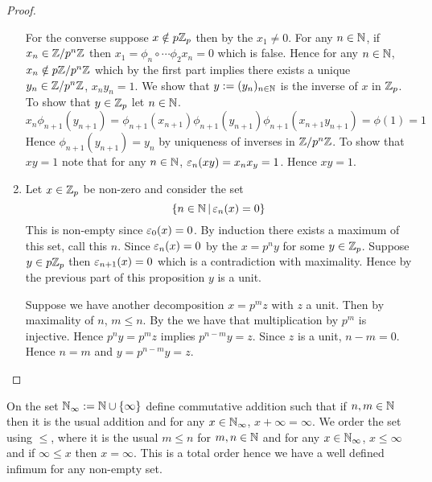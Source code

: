 \begin{proof}
\begin{enumerate}
            For the converse suppose $x \notin p \mathbb{Z}_p$
            then by the
            $x_1 \ne 0$.
            For any $n \in \mathbb{N}$, 
            if $x_n \in \mathbb{Z}/p^{n}\mathbb{Z}$ then 
            $x_1 = \phi_n \circ \cdots \phi_2 x_n = 0$
            which is false.
            Hence for any $n \in \mathbb{N}$, $x_n \notin p \mathbb{Z}/p^{n}\mathbb{Z}$
            which by the first part implies there exists
            a unique $y_n \in \mathbb{Z}/p^{n}\mathbb{Z}$, $x_n y_n = 1$.
            We show that $y := (y_n)_{n \in \mathbb{N}}$ is the inverse of $x$
            in $\mathbb{Z}_p$.
            To show that $y \in \mathbb{Z}_p$ let $n \in \mathbb{N}$.
            \[x_n \phi_{n+1} (y_{n+1}) = 
            \phi_{n+1}(x_{n+1})\phi_{n+1}(y_{n+1})
            \phi_{n+1}(x_{n+1} y_{n+1}) = \phi(1) = 1\]
            Hence $\phi_{n+1} (y_{n+1}) = y_n$ 
            by uniqueness of inverses in $\mathbb{Z}/p^{n}\mathbb{Z}$.
            To show that $x y = 1$ note that
            for any $n \in \mathbb{N}$, 
            $\varepsilon_n(xy) = x_n x_y = 1$.
            Hence $xy = 1$.
        \item Let $x \in \mathbb{Z}_p$ be non-zero and consider
            the set \[\left\{n \in \mathbb{N} \,|\, \varepsilon_n (x) = 0\right\}\]
            This is non-empty since $\varepsilon_0 (x) = 0$.
            By induction there exists a maximum of this set,
            call this $n$.
            Since $\varepsilon_n(x) = 0$ by the 
            $x = p^n y$ for some $y \in \mathbb{Z}_p$.
            Suppose $y \in p \mathbb{Z}_p$ then $\varepsilon_{n + 1} (x) = 0$
            which is a contradiction with maximality.
            Hence by the previous part of this proposition
            $y$ is a unit.
            
            Suppose we have another decomposition 
            $x = p^m z$ with $z$ a unit.
            Then by maximality of $n$, $m \le n$.
            By the 
            we have that multiplication by $p^m$ is injective.
            Hence $p^n y = p^m z$ implies $p^{n-m} y = z$.
            Since $z$ is a unit, $n - m = 0$.
            Hence $n = m$ and $y = p^{n-m} y = z$.
    \end{enumerate}
\end{proof}

\begin{dfn}[$\N_\infty$]
    On the set $\mathbb{N}_{\infty} := \mathbb{N} \cup \left\{\infty\right\}$ 
    define commutative addition such that
    if $n,m \in \mathbb{N}$ then it is the usual addition and
    for any $x \in \mathbb{N}_\infty$, $x + \infty = \infty$.
    We order the set using $\le$, 
    where it is the usual $m\le n$ for $m,n \in \mathbb{N}$
    and for any $x \in \mathbb{N}_\infty$, $x \le \infty$ and 
    if $\infty \le x$ then $x = \infty$.
    This is a total order hence we have a well defined
    infimum for any non-empty set.
\end{dfn}

